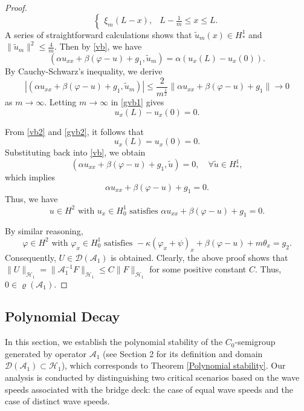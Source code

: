 \documentclass[11pt,reqno]{article}
\begin{document}
\begin{proof}
\[\begin{cases}
		\xi_m(L-x), & L-\frac{1}{m}\le x\le L.
	\end{cases}
	\]
	A series of straightforward calculations shows that $\tilde{u}_m(x)\in H_*^1$ and $\|\tilde{u}_m\|^2 \le\frac{4}{m}$. Then by \eqref{vb}, we have
	\begin{equation}\label{gvb1}
		(\alpha u_{xx}+\beta(\varphi - u) + g_1,\tilde{u}_m)=\alpha \left(u_x(L)-u_x(0)\right).
	\end{equation}
	By Cauchy-Schwarz's inequality, we derive
	\[
	\left| (\alpha u_{xx}+\beta(\varphi - u) + g_1,\tilde{u}_m)\right|\le\frac{2}{m^{\frac{1}{2}}}\|\alpha u_{xx}+\beta(\varphi - u) + g_1\|\to0
	\]
	as $m\to\infty$.
    Letting $m\to\infty$ in \eqref{gvb1} gives
	\begin{equation}\label{gvb2}
		u_x(L)-u_x(0)=0.
	\end{equation}
	
	From \eqref{vb2} and \eqref{gvb2}, it follows that
	\[
	u_x(L)=u_x(0)=0.
	\]
	Substituting back into \eqref{vb}, we obtain
	\[
	(\alpha u_{xx}+\beta(\varphi - u) + g_1,\tilde{u})=0, \quad \forall \tilde{u}\in H_*^1,
	\]
	which implies
	\[
	\alpha u_{xx}+\beta(\varphi - u) + g_1=0.
	\]
	Thus, we have
	\begin{equation}\label{jl6}
		u\in H^2\text{ with } u_x\in H_0^1 \text{ satisfies } \alpha u_{xx}+\beta(\varphi - u) + g_1=0.
	\end{equation}
	
	By similar reasoning,
	\begin{equation}\label{jl7}
		\varphi\in H^2\text{ with } \varphi_x\in H_0^1\text{ satisfies } -\kappa(\varphi_x + \psi)_x + \beta(\varphi - u) + m\theta_x = g_2.
	\end{equation}
	Consequently, $U \in \mathcal{D}(\mathcal{A}_1)$ is obtained. Clearly, the above proof shows that $\|U\|_{\mathcal{H}_1}=\|\mathcal{A}_1^{-1}F\|_{\mathcal{H}_1} \leq C\|F\|_{\mathcal{H}_1}$ for some positive constant $C$. Thus, $0 \in \varrho(\mathcal{A}_1)$.
\end{proof}

\subsection{Polynomial Decay}\label{sec2.2}
In this section, we establish the polynomial stability of the \(C_0\)-semigroup generated by operator \(\mathcal{A}_1\) (see Section 2 for its definition and domain \(\mathcal{D}(\mathcal{A}_1) \subset \mathcal{H}_1\)), which corresponds to Theorem \ref{Polynomial stability}. Our analysis is conducted by distinguishing two critical scenarios based on the wave speeds associated with the bridge deck: the case of equal wave speeds and the case of distinct wave speeds.
\end{document}
